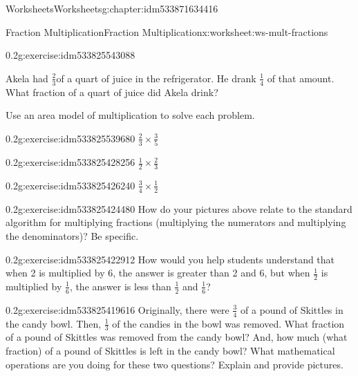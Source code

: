 \documentclass[twoside,11pt,]{book}
\begin{document}
\begin{chapterptx}{Worksheets}{}{Worksheets}{}{}{g:chapter:idm533871634416}
\begin{worksheet-section-numberless}{Fraction Multiplication}{}{Fraction Multiplication}{}{}{x:worksheet:ws-mult-fractions}
\begin{divisionexercise}{6}{}{0.2}{g:exercise:idm533825543088}
\par
Akela had \(\frac{2}{3} \)of a quart of juice in the refrigerator.  He drank \(\frac{1}{4} \) of that amount. What fraction of a quart of juice did Akela drink?%
\end{divisionexercise}%
\begin{introduction}{}%
Use an area model of multiplication to solve each problem.%
\end{introduction}%
\begin{divisionexercise}{7}{}{0.2}{g:exercise:idm533825539680}%
\(\frac{2}{3} \times \frac{3}{5} \)%
\end{divisionexercise}%
\begin{divisionexercise}{8}{}{0.2}{g:exercise:idm533825428256}%
\(\frac{1}{2} \times \frac{2}{3} \)%
\end{divisionexercise}%
\clearpage
\begin{divisionexercise}{9}{}{0.2}{g:exercise:idm533825426240}%
\(\frac{3}{4} \times \frac{1}{2} \)%
\end{divisionexercise}%
\begin{divisionexercise}{10}{}{0.2}{g:exercise:idm533825424480}%
How do your pictures above relate to the standard algorithm for multiplying fractions (multiplying the numerators and multiplying the denominators)? Be specific.%
\end{divisionexercise}%
\begin{divisionexercise}{11}{}{0.2}{g:exercise:idm533825422912}%
How would you help students understand that when 2 is multiplied by 6, the answer is greater than 2 and 6, but when \(\frac{1}{2} \) is multiplied by \(\frac{1}{6} \), the answer is less than \(\frac{1}{2} \) and \(\frac{1}{6} \)?%
\end{divisionexercise}%
\clearpage
\begin{divisionexercise}{12}{}{0.2}{g:exercise:idm533825419616}%
Originally, there were \(\frac{3}{4} \) of a pound of Skittles in the candy bowl. Then, \(\frac{1}{3} \) of the candies in the bowl was removed. What fraction of a pound of Skittles was removed from the candy bowl? And, how much (what fraction) of a pound of Skittles is left in the candy bowl? What mathematical operations are you doing for these two questions? Explain and provide pictures.%
\end{divisionexercise}%
\end{worksheet-section-numberless}
\restoregeometry
%
%
\typeout{************************************************}

\end{chapterptx}
\end{document}
